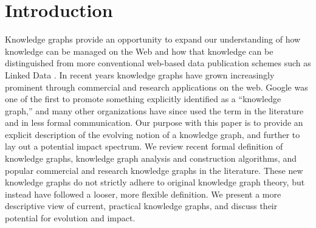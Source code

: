 \section{Introduction}


Knowledge graphs provide an opportunity to expand our understanding of how knowledge can be managed on the Web and how that knowledge can be distinguished from more conventional web-based data publication schemes such as Linked Data \cite{bizer2009linked}.
In recent years knowledge graphs have grown increasingly prominent through commercial and research applications on the web.
Google was one of the first to promote something explicitly identified as a ``knowledge graph,'' \cite{singhal2012introducing} and many other organizations have since used the term in the literature and in less formal communication.
Our purpose with this paper is to provide an explicit description of the evolving notion of a knowledge graph, and further to lay out a potential impact spectrum.  
We review recent formal definition of knowledge graphs, knowledge graph analysis and construction algorithms, and popular commercial and research knowledge graphs in the literature.
These new knowledge graphs do not strictly adhere to original knowledge graph theory, but instead have followed a looser, more flexible definition.
We present a more descriptive view of current, practical knowledge graphs, and discuss their potential for evolution and impact.